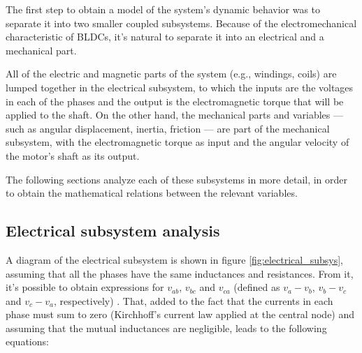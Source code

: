 \documentclass{article}
\begin{document}
    \newpage

    The first step to obtain a model of the system's dynamic behavior was to separate it into two smaller coupled subsystems. Because of the electromechanical characteristic of BLDCs, it's natural to separate it into an electrical and a mechanical part.

    All of the electric and magnetic parts of the system (e.g., windings, coils) are lumped together in the electrical subsystem,
    to which the inputs are the voltages in each of the phases and the output is the electromagnetic torque that will be applied to the shaft.  On the other hand, the mechanical parts and variables --- such as angular displacement, inertia, friction --- are part of the mechanical subsystem, with the electromagnetic torque as input and the angular velocity of the motor's shaft as its output.

    The following sections analyze each of these subsystems in more detail, in order to obtain the mathematical relations between the relevant variables.


    \subsection{Electrical subsystem analysis}
    \label{sec:elec_subsystem}

    A diagram of the electrical subsystem is shown in figure \ref{fig:electrical_subsys}, assuming that all the phases have the same inductances and resistances. From it, it's possible to obtain expressions for $v_{ab}$, $v_{bc}$ and $v_{ca}$ (defined as $v_a-v_b$, $v_b-v_c$ and $v_c-v_a$, respectively) \cite[p. 457-459]{ref:electrical_modeling}. That, added to the fact that the currents in each phase must sum to zero (Kirchhoff's current law applied at the central node) and assuming that the mutual inductances are negligible, leads to the following equations:
\end{document}
